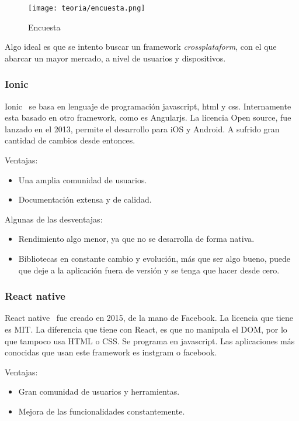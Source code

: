 \begin{figure}[h]
	\centering
	\texttt{[image: teoria/encuesta.png]}
	\caption{Encuesta}\label{fig:encuesta}
\end{figure}

Algo ideal es que se intento buscar un framework \emph{crossplataform}, con el que abarcar un mayor mercado, a nivel de usuarios y dispositivos.

\subsubsection{Ionic}
Ionic~\cite{wiki:ionnic} se basa en lenguaje de programación javascript, html y css. Internamente esta basado en otro framework, como es Angularjs. La licencia Open source, fue lanzado en el 2013, permite el desarrollo para iOS y Android. A sufrido gran cantidad de cambios desde entonces.

Ventajas:
\begin{itemize}
	\item Una amplia comunidad de usuarios.
	\item Documentación extensa y de calidad.
\end{itemize}

Algunas de las desventajas:
\begin{itemize}
	\item Rendimiento algo menor, ya que no se desarrolla de forma nativa.
	\item Bibliotecas en constante cambio y evolución, más que ser algo bueno, puede que deje a la aplicación fuera de versión y se tenga que hacer desde cero.
\end{itemize}

\subsubsection{React native}
React native~\cite{wiki:react} fue creado en 2015, de la mano de Facebook. La licencia que tiene es MIT. La diferencia que tiene con React, es que no manipula el DOM, por lo que tampoco usa HTML o CSS. 
Se programa en javascript. Las aplicaciones más conocidas que usan este framework es instgram o facebook.

Ventajas:
\begin{itemize}
	\item Gran comunidad de usuarios y herramientas.
	\item Mejora de las funcionalidades constantemente.
\end{itemize}

